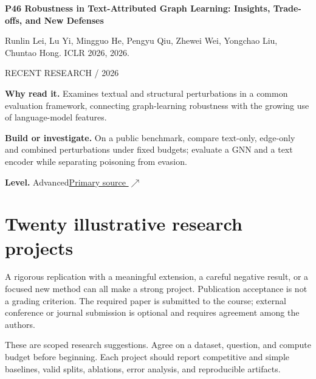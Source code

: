 \documentclass[11pt,letterpaper]{article}
\begin{document}
\begin{minipage}{\linewidth}
{\large\bfseries P46 Robustness in Text-Attributed Graph Learning: Insights, Trade-offs, and New Defenses}\par
Runlin Lei, Lu Yi, Mingguo He, Pengyu Qiu, Zhewei Wei, Yongchao Liu, Chuntao Hong. ICLR 2026, 2026.\par
\textcolor{ink}{\small RECENT RESEARCH / 2026}\par
\textbf{Why read it.} Examines textual and structural perturbations in a common evaluation framework, connecting graph-learning robustness with the growing use of language-model features.\par
\textbf{Build or investigate.} On a public benchmark, compare text-only, edge-only and combined perturbations under fixed budgets; evaluate a GNN and a text encoder while separating poisoning from evasion.\par
\textbf{Level.} Advanced\quad\href{https://proceedings.iclr.cc/paper_files/paper/2026/hash/5133c31f29df92e056434cd86805cb6a-Abstract-Conference.html}{Primary source $\nearrow$}\par
\end{minipage}\par\vspace{10pt}
\section*{Twenty illustrative research projects}
A rigorous replication with a meaningful extension, a careful negative result, or a focused new method can all make a strong project. Publication acceptance is not a grading criterion. The required paper is submitted to the course; external conference or journal submission is optional and requires agreement among the authors.\par
These are scoped research suggestions. Agree on a dataset, question, and compute budget before beginning. Each project should report competitive and simple baselines, valid splits, ablations, error analysis, and reproducible artifacts.\par
\end{document}
